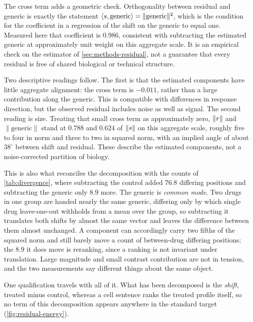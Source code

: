 The cross term adds a geometric check. Orthogonality between residual and generic is exactly the statement
$\langle s, \textrm{generic}\rangle = \lVert \textrm{generic} \rVert^{2}$,
which is the condition for the coefficient in a regression of the shift on the
generic to equal one. Measured here that coefficient is $0.986$, consistent with
subtracting the estimated generic at approximately unit weight on this aggregate
scale. It is an empirical check on the estimator of \cref{sec:methods-residual},
not a guarantee that every residual is free of shared biological or technical
structure.

Two descriptive readings follow. The first is that the estimated components have
little aggregate alignment: the cross term is $-0.011$, rather than a large
contribution along the generic. This is compatible with differences in response
direction, but the observed residual includes noise as well as signal. The
second reading is size. Treating that small cross term as approximately zero,
$\lVert r \rVert$ and $\lVert \textrm{generic} \rVert$ stand at $0.788$ and
$0.624$ of $\lVert s \rVert$ on this aggregate scale, roughly five to four
in norm and three to two in squared norm, with an implied angle of about
$38^{\circ}$ between shift and residual. These describe the estimated components,
not a noise-corrected partition of biology.

This is also what reconciles the decomposition with the counts of
\cref{tab:divergence}, where subtracting the control added $76.8$ differing
positions and subtracting the generic only $8.9$ more. The generic is
\emph{common mode}. Two drugs in one group are handed nearly the same generic,
differing only by which single drug leave-one-out withholds from a mean over the
group, so subtracting it translates both shifts by almost the same vector and
leaves the difference between them almost unchanged. A component can accordingly
carry two fifths of the squared norm and still barely move a count of between-drug
differing positions; the $8.9$ it does move is reranking, since a ranking is not
invariant under translation. Large magnitude and small contrast contribution are
not in tension, and the two measurements say different things about the same
object.

One qualification travels with all of it. What has been decomposed is the
\emph{shift}, treated minus control, whereas a cell sentence ranks the treated
profile itself, so no term of this decomposition appears anywhere in the standard
target (\cref{fig:residual-energy}).

